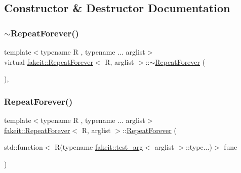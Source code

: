 \subsection{Constructor \& Destructor Documentation}
\mbox{\label{structfakeit_1_1RepeatForever_ae4c256607ab407cea8403d49538cb320}} 
\subsubsection{\texorpdfstring{$\sim$RepeatForever()}{~RepeatForever()}\hspace{0.1cm}{\footnotesize\ttfamily [1/9]}}
{\footnotesize\ttfamily template$<$typename R , typename ... arglist$>$ \\
virtual \mbox{\hyperlink{structfakeit_1_1RepeatForever}{fakeit\+::\+Repeat\+Forever}}$<$ R, arglist $>$\+::$\sim$\mbox{\hyperlink{structfakeit_1_1RepeatForever}{Repeat\+Forever}} (\begin{DoxyParamCaption}{ }\end{DoxyParamCaption})\hspace{0.3cm}{\ttfamily [virtual]}, {\ttfamily [default]}}

\mbox{\label{structfakeit_1_1RepeatForever_a4f3eb9d8eda23dcc882ab5363466a379}} 
\subsubsection{\texorpdfstring{RepeatForever()}{RepeatForever()}\hspace{0.1cm}{\footnotesize\ttfamily [1/9]}}
{\footnotesize\ttfamily template$<$typename R , typename ... arglist$>$ \\
\mbox{\hyperlink{structfakeit_1_1RepeatForever}{fakeit\+::\+Repeat\+Forever}}$<$ R, arglist $>$\+::\mbox{\hyperlink{structfakeit_1_1RepeatForever}{Repeat\+Forever}} (\begin{DoxyParamCaption}\item[{std\+::function$<$ R(typename \mbox{\hyperlink{structfakeit_1_1test__arg}{fakeit\+::test\+\_\+arg}}$<$ arglist $>$\+::type...)$>$}]{func }\end{DoxyParamCaption})\hspace{0.3cm}{\ttfamily [inline]}}

